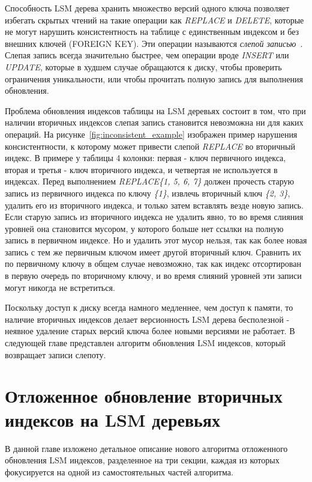 \documentclass[a4paper,hidelinks,12pt]{article}
\begin{document}
Способность LSM дерева хранить множество версий одного ключа позволяет избегать
скрытых чтений на такие операции как \textit{REPLACE} и \textit{DELETE},
которые не могут нарушить консистентность на таблице с единственным индексом и
без внешних ключей (FOREIGN KEY). Эти операции называются
\textit {слепой записью}~\cite{slimdb}. Слепая запись всегда значительно
быстрее, чем операции вроде \textit{INSERT} или \textit{UPDATE}, которые в
худшем случае обращаются к диску, чтобы проверить ограничения уникальности, или
чтобы прочитать полную запись для выполнения обновления.

Проблема обновления индексов таблицы на LSM деревьях состоит в том, что при
наличии вторичных индексов слепая запись становится невозможна ни для каких
операций. На рисунке~\ref{fig:inconsistent_example} изображен пример нарушения
консистентности, к которому может привести слепой \textit{REPLACE} во вторичный
индекс. В примере у таблицы 4 колонки: первая - ключ первичного индекса,
вторая и третья - ключ вторичного индекса, и четвертая не используется в
индексах. Перед выполнением \textit{REPLACE\{1, 5, 6, 7\}} должен прочесть
старую запись из первичного индекса по ключу \textit{\{1\}}, извлечь вторичный
ключ \textit{\{2, 3\}}, удалить его из вторичного индекса, и только затем
вставлять везде новую запись. Если старую запись из вторичного индекса не
удалить явно, то во время слияния уровней она становится мусором, у которого
больше нет ссылки на полную запись в первичном индексе. Но и удалить этот мусор
нельзя, так как более новая запись с тем же первичным ключом имеет другой
вторичный ключ. Сравнить их по первичному ключу в общем случае невозможно, так
как индекс отсортирован в первую очередь по вторичному ключу, и во время слияний
уровней эти записи могут никогда не встретиться.

Поскольку доступ к диску всегда намного медленнее, чем доступ к памяти, то
наличие вторичных индексов делает версионность LSM дерева бесполезной - неявное
удаление старых версий ключа более новыми версиями не работает. В следующей
главе представлен алгоритм обновления LSM индексов, который возвращает записи
слепоту.

\section{Отложенное обновление вторичных индексов на LSM деревьях}
В данной главе изложено детальное описание нового алгоритма отложенного
обновления LSM индексов, разделенное на три секции, каждая из которых
фокусируется на одной из самостоятельных частей алгоритма.
\end{document}
